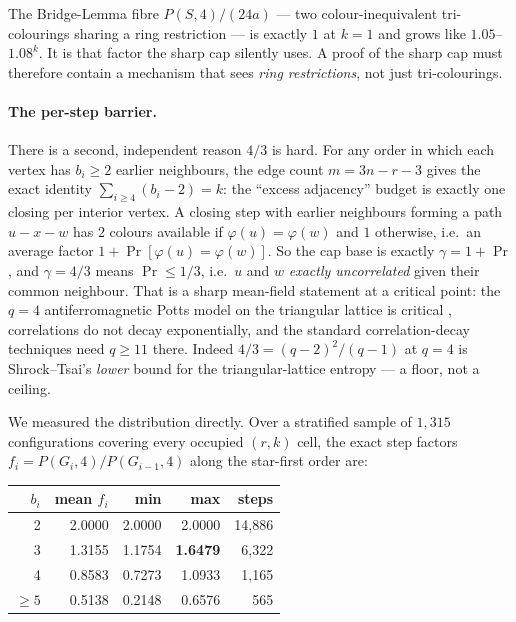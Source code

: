 \documentclass[11pt]{article}
\theoremstyle{definition}
\begin{document}
The Bridge-Lemma fibre $P(S,4)/(24a)$ --- two colour-inequivalent tri-colourings
sharing a ring restriction --- is exactly $1$ at $k=1$ and grows like $1.05$--$1.08^k$.
It is that factor the sharp cap silently uses. A proof of the sharp cap must
therefore contain a mechanism that sees \emph{ring restrictions}, not just
tri-colourings.

\paragraph{The per-step barrier.} There is a second, independent reason $4/3$ is hard.
For any order in which each vertex has $b_i \ge 2$ earlier neighbours, the edge count
$m = 3n-r-3$ gives the exact identity $\sum_{i\ge4}(b_i-2) = k$: the ``excess
adjacency'' budget is exactly one closing per interior vertex. A closing step with
earlier neighbours forming a path $u\!-\!x\!-\!w$ has $2$ colours available if
$\varphi(u)=\varphi(w)$ and $1$ otherwise, i.e.\ an average factor
$1 + \Pr[\varphi(u)=\varphi(w)]$. So the cap base is exactly $\gamma = 1+\Pr$, and
$\gamma=4/3$ means $\Pr \le 1/3$, i.e.\ $u$ and $w$ \emph{exactly uncorrelated} given
their common neighbour. That is a sharp mean-field statement at a critical point: the
$q=4$ antiferromagnetic Potts model on the triangular lattice is critical
\cite{moore2000}, correlations do not decay exponentially, and the standard
correlation-decay techniques \cite{salas1997} need $q\ge11$ there. Indeed
$4/3 = (q-2)^2/(q-1)$ at $q=4$ is Shrock--Tsai's \emph{lower} bound for the
triangular-lattice entropy \cite{shrock1997} --- a floor, not a ceiling.

We measured the distribution directly. Over a stratified sample of $1{,}315$
configurations covering every occupied $(r,k)$ cell, the exact step factors
$f_i = P(G_i,4)/P(G_{i-1},4)$ along the star-first order are:

\begin{center}\small
\begin{tabular}{rrrrr}
\toprule
$b_i$ & mean $f_i$ & min & max & steps \\
\midrule
2   & 2.0000 & 2.0000 & 2.0000 & 14{,}886 \\
3   & 1.3155 & 1.1754 & \textbf{1.6479} & 6{,}322 \\
4   & 0.8583 & 0.7273 & 1.0933 & 1{,}165 \\
$\ge5$ & 0.5138 & 0.2148 & 0.6576 & 565 \\
\bottomrule
\end{tabular}
\end{center}
\end{document}
